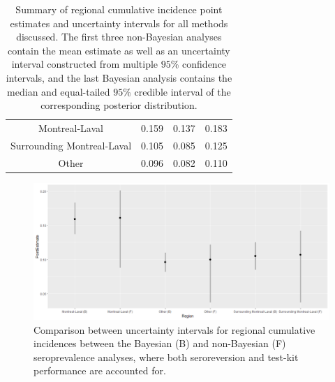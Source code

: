 \begin{table}[]
\begin{tabular}{c|ccc}
Montreal-Laval             & 0.159               & 0.137                  & 0.183                  \\
Surrounding Montreal-Laval & 0.105               & 0.085                  & 0.125                  \\
Other                      & 0.096               & 0.082                  & 0.110                 
\end{tabular}
\caption{Summary of regional cumulative incidence point estimates and uncertainty intervals for all methods discussed. The first three non-Bayesian analyses contain the mean estimate as well as an uncertainty interval constructed from multiple $95$\% confidence intervals, and the last Bayesian analysis contains the median and equal-tailed $95$\% credible interval of the corresponding posterior distribution.}
\label{tab:results}
\end{table}

\captionsetup[subfigure]{labelformat=empty}
\begin{figure}[ht!]
\centering
    \includegraphics[width=\columnwidth]{../../plot/intervals.png}
    \caption{Comparison between uncertainty intervals for regional cumulative incidences between the Bayesian (B) and non-Bayesian (F) seroprevalence analyses, where both seroreversion and test-kit performance are accounted for.}
    \label{fig:intervals}
\end{figure}